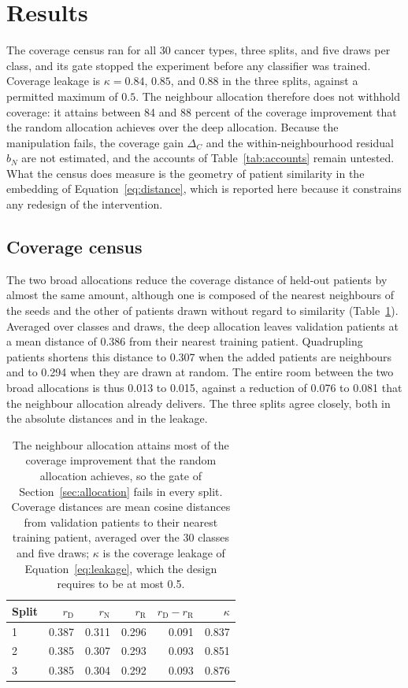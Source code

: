 \section{Results}
\label{sec:results}
The coverage census ran for all 30 cancer types, three splits, and five draws per class, and its gate stopped the experiment before any classifier was trained. Coverage leakage is $\kappa=0.84$, $0.85$, and $0.88$ in the three splits, against a permitted maximum of $0.5$. The neighbour allocation therefore does not withhold coverage: it attains between 84 and 88 percent of the coverage improvement that the random allocation achieves over the deep allocation. Because the manipulation fails, the coverage gain $\Delta_C$ and the within-neighbourhood residual $b_N$ are not estimated, and the accounts of Table~\ref{tab:accounts} remain untested. What the census does measure is the geometry of patient similarity in the embedding of Equation~\eqref{eq:distance}, which is reported here because it constrains any redesign of the intervention.

\subsection{Coverage census}
\label{sec:census-results}
The two broad allocations reduce the coverage distance of held-out patients by almost the same amount, although one is composed of the nearest neighbours of the seeds and the other of patients drawn without regard to similarity (Table~\ref{tab:census}). Averaged over classes and draws, the deep allocation leaves validation patients at a mean distance of 0.386 from their nearest training patient. Quadrupling patients shortens this distance to 0.307 when the added patients are neighbours and to 0.294 when they are drawn at random. The entire room between the two broad allocations is thus 0.013 to 0.015, against a reduction of 0.076 to 0.081 that the neighbour allocation already delivers. The three splits agree closely, both in the absolute distances and in the leakage.

\begin{table}[htbp]
\centering
\renewcommand{\arraystretch}{1.15}
\begin{tabular}{@{}lrrrrr@{}}
\toprule
Split & $r_{\mathrm D}$ & $r_{\mathrm N}$ & $r_{\mathrm R}$ & $r_{\mathrm D}-r_{\mathrm R}$ & $\kappa$ \\
\midrule
1 & 0.387 & 0.311 & 0.296 & 0.091 & 0.837 \\
2 & 0.385 & 0.307 & 0.293 & 0.093 & 0.851 \\
3 & 0.385 & 0.304 & 0.292 & 0.093 & 0.876 \\
\bottomrule
\end{tabular}
\caption{The neighbour allocation attains most of the coverage improvement that the random allocation achieves, so the gate of Section~\ref{sec:allocation} fails in every split. Coverage distances are mean cosine distances from validation patients to their nearest training patient, averaged over the 30 classes and five draws; $\kappa$ is the coverage leakage of Equation~\eqref{eq:leakage}, which the design requires to be at most 0.5.}
\label{tab:census}
\end{table}

